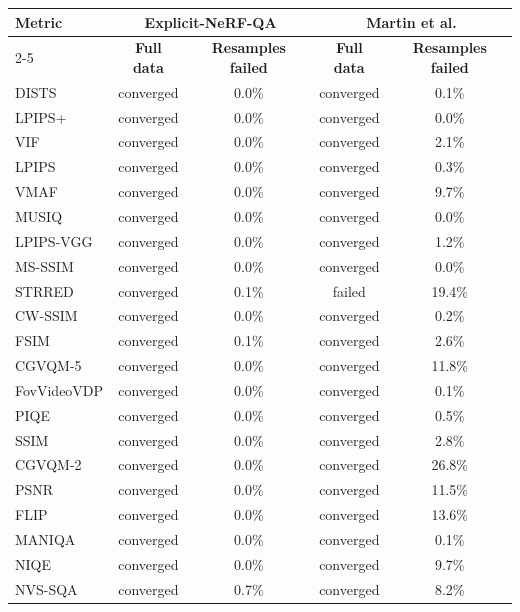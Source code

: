 \begin{tabular}{l|cc|cc}
\hline
\multirow{2}{*}{\textbf{Metric}} & \multicolumn{2}{c|}{\textbf{Explicit-NeRF-QA}} & \multicolumn{2}{c}{\textbf{Martin et al.}} \\
\cline{2-5}
 & \textbf{Full data} & \textbf{Resamples failed} & \textbf{Full data} & \textbf{Resamples failed} \\
\hline
DISTS & converged & 0.0\% & converged & 0.1\% \\
LPIPS+ & converged & 0.0\% & converged & 0.0\% \\
VIF & converged & 0.0\% & converged & 2.1\% \\
LPIPS & converged & 0.0\% & converged & 0.3\% \\
VMAF & converged & 0.0\% & converged & 9.7\% \\
MUSIQ & converged & 0.0\% & converged & 0.0\% \\
LPIPS-VGG & converged & 0.0\% & converged & 1.2\% \\
MS-SSIM & converged & 0.0\% & converged & 0.0\% \\
STRRED & converged & 0.1\% & failed & 19.4\% \\
CW-SSIM & converged & 0.0\% & converged & 0.2\% \\
FSIM & converged & 0.1\% & converged & 2.6\% \\
CGVQM-5 & converged & 0.0\% & converged & 11.8\% \\
FovVideoVDP & converged & 0.0\% & converged & 0.1\% \\
PIQE & converged & 0.0\% & converged & 0.5\% \\
SSIM & converged & 0.0\% & converged & 2.8\% \\
CGVQM-2 & converged & 0.0\% & converged & 26.8\% \\
PSNR & converged & 0.0\% & converged & 11.5\% \\
FLIP & converged & 0.0\% & converged & 13.6\% \\
MANIQA & converged & 0.0\% & converged & 0.1\% \\
NIQE & converged & 0.0\% & converged & 9.7\% \\
NVS-SQA & converged & 0.7\% & converged & 8.2\% \\
\hline
\end{tabular}
